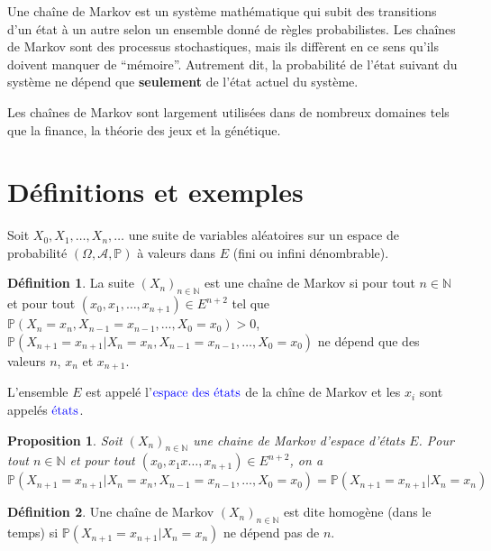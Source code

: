 \documentclass[
]{book}
\newtheorem{proposition}{Proposition}[chapter]
\theoremstyle{definition}
\newtheorem{definition}{Définition}[chapter]
\theoremstyle{definition}
\theoremstyle{definition}
\theoremstyle{remark}
\begin{document}
Une chaîne de Markov est un système mathématique qui subit des transitions d'un état à un autre selon un ensemble donné de règles probabilistes. Les chaînes de Markov sont des processus stochastiques, mais ils diffèrent en ce sens qu'ils doivent manquer de ``mémoire''. Autrement dit, la probabilité de l'état suivant du système ne dépend que \textbf{seulement} de l'état actuel du système.

Les chaînes de Markov sont largement utilisées dans de nombreux domaines tels que la finance, la théorie des jeux et la génétique.

\hypertarget{duxe9finitions-et-exemples}{%
\section{Définitions et exemples}\label{duxe9finitions-et-exemples}}

Soit \(X_0, X_1,\ldots, X_n, \ldots\) une suite de variables aléatoires sur un espace de probabilité \((\Omega,\mathcal{A}, \mathbb{P})\) à valeurs dans \(E\) (fini ou infini dénombrable).

\begin{definition}
\protect\hypertarget{def:unnamed-chunk-35}{}{\label{def:unnamed-chunk-35} }La suite \((X_n)_{n \in \mathbb{N}}\) est une chaîne de Markov si pour tout \(n \in \mathbb{N}\) et pour tout \((x_0,x_1, \ldots,x_{n+1}) \in E^{n+2}\) tel que \(\mathbb{P}(X_n=x_n, X_{n-1}=x_{n-1},\ldots, X_0=x_0) >0\), \(\mathbb{P}(X_{n+1}=x_{n+1}|X_n=x_n,X_{n-1}=x_{n-1},\ldots, X_0=x_0)\) ne dépend que des valeurs \(n\), \(x_n\) et \(x_{n+1}\).
\end{definition}
L'ensemble \(E\) est appelé l'\(\color{blue}{\mathbf{\text{espace des états}}}\) de la chîne de Markov et les \(x_i\) sont appelés \(\color{blue}{\mathbf{\text{états}}}\).
\begin{proposition}
\protect\hypertarget{prp:unnamed-chunk-36}{}{\label{prp:unnamed-chunk-36} }Soit \((X_n)_{n \in \mathbb{N}}\) une chaine de Markov d'espace d'états \(E\). Pour tout \(n \in \mathbb{N}\) et pour tout \((x_0,x_1x\ldots,x_{n+1})\in E^{n+2}\), on a
\[\mathbb{P}(X_{n+1}=x_{n+1}|X_n=x_n,X_{n-1}=x_{n-1},\ldots, X_0=x_0)=\mathbb{P}(X_{n+1}=x_{n+1}|X_n=x_n)\]
\end{proposition}

\begin{definition}
\protect\hypertarget{def:unnamed-chunk-37}{}{\label{def:unnamed-chunk-37} }Une chaîne de Markov \((X_n)_{n \in \mathbb{N}}\) est dite homogène (dans le temps) si \(\mathbb{P}(X_{n+1}=x_{n+1}|X_n=x_n)\) ne dépend pas de \(n\).
\end{definition}
\end{document}
